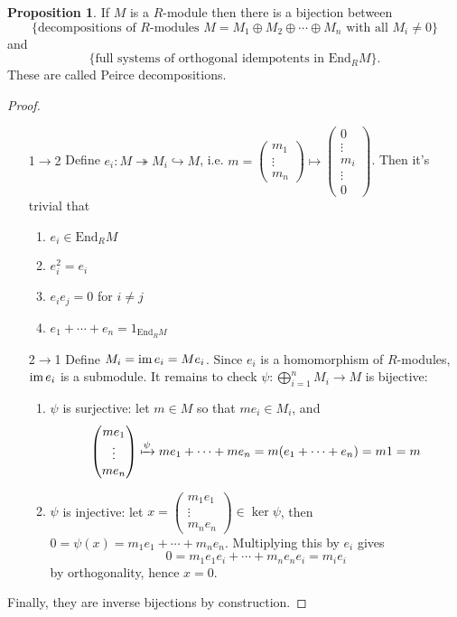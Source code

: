 \documentclass[a4paper]{article}
\newcommand{\End}{\text{End}}
\newcommand{\im}{\text{im\,}}
\theoremstyle{definition}
\newtheorem{prop}[defn]{Proposition}
\begin{document}
\begin{prop}
\label{prop:bijbetdecompandfullsys}
If $M$ is a $R$-module then there is a bijection between
\[
\{\text{decompositions of }R\text{-modules }M=M_1\oplus M_2\oplus\cdots\oplus M_n\text{ with all }M_i\neq 0\}
\]
and
\[
\{\text{full systems of orthogonal idempotents in }\End_R M\}.
\]
These are called Peirce decompositions.
\end{prop}
\begin{proof}
\begin{itemize}
\item[1$\rightarrow$2] Define $e_i:M\twoheadrightarrow M_i\hookrightarrow M$, i.e. $m=\begin{pmatrix}
  m_1\\ \vdots \\ m_n
\end{pmatrix}\mapsto \begin{pmatrix}
  0\\ \vdots \\ m_i \\ \vdots \\ 0
\end{pmatrix}$. Then it's trivial that
\begin{enumerate}[label=\roman*.]
\item $e_i\in \End_R M$
\item $e_i^2=e_i$
\item $e_ie_j=0$ for $i\neq j$
\item $e_1+\cdots +e_n=1_{\End_R M}$
\end{enumerate}
\item[2$\rightarrow$1] Define $M_i=\im e_i=Me_i$. Since $e_i$ is a homomorphism of $R$-modules, $\im e_i$ is a submodule. It remains to check $\psi:\bigoplus_{i=1}^n M_i\rightarrow M$ is bijective:
\begin{enumerate}[label=\roman*.]
\item $\psi$ is surjective: let $m\in M$ so that $me_i\in M_i$, and
\[
\begin{pmatrix}
me_1\\ \vdots \\ me_n
\end{pmatrix}\xmapsto{\psi} me_1+\cdots+me_n=m(e_1+\cdots+e_n)=m1=m
\]
\item $\psi$ is injective: let $x=\begin{pmatrix}
m_1e_1\\ \vdots \\ m_ne_n
\end{pmatrix}\in\ker\psi$, then $0=\psi(x)=m_1e_1+\cdots+m_ne_n$. Multiplying this by $e_i$ gives
\[
0=m_1e_1e_i+\cdots+m_ne_ne_i=m_ie_i
\]
by orthogonality, hence $x=0$.
\end{enumerate}
\end{itemize}
Finally, they are inverse bijections by construction.
\end{proof}
\end{document}
